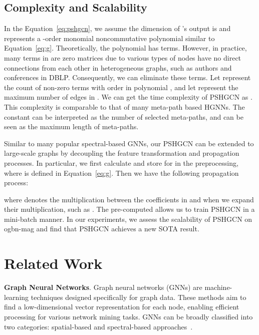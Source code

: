 \documentclass{article}
\begin{document}
\subsection{Complexity and Scalability}\label{se:scale}
In the Equation~\eqref{eq:pshgcn}, we assume the 
dimension of 's output is  and  represents a -order monomial noncommutative polynomial similar to Equation~\eqref{eq:g}. Theoretically, the polynomial  has  terms. However, in practice, many terms  in  are zero matrices due to various types of nodes have no direct connections from each other in heterogeneous graphs, such as authors and conferences in DBLP.
Consequently, we can eliminate these terms. Let  represent the count of non-zero terms with order  in polynomial , and let  represent the maximum number of edges in . We can get the time complexity of PSHGCN as . This complexity is comparable to that of many meta-path based HGNNs. The constant  can be interpreted as the number of selected meta-paths, and  can be seen as the maximum length of meta-paths.

Similar to many popular spectral-based GNNs, our PSHGCN can be extended to large-scale graphs by decoupling the feature transformation and propagation processes. In particular, we first calculate and store  for  in the preprocessing, where  is defined in Equation~\eqref{eq:g}. Then we have the following propagation process:

where  denotes the multiplication between the coefficients in  and  when we expand their multiplication, such as . The pre-computed  allows us to train PSHGCN in a mini-batch manner.  In our experiments, we assess the scalability of PSHGCN on ogbn-mag and find that PSHGCN achieves a new SOTA result. 











\section{Related Work}
\textbf{Graph Neural Networks}. Graph neural networks (GNNs) are machine-learning techniques designed specifically for graph data. These methods aim to find a low-dimensional vector representation for each node, enabling efficient processing for various network mining tasks. GNNs can be broadly classified into two categories: spatial-based and spectral-based approaches~\cite{wu2020comprehensive}. 
\end{document}
